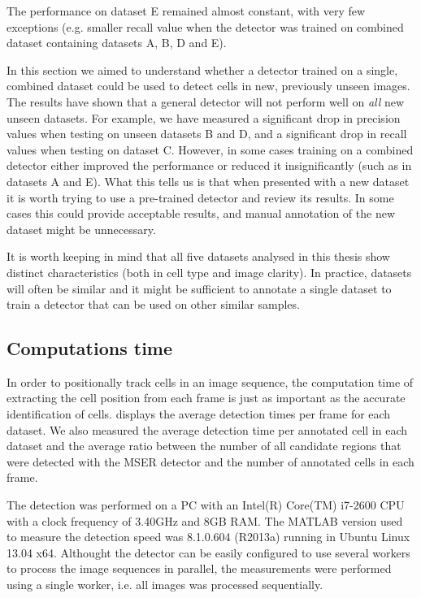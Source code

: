 		The performance on dataset E remained almost constant, with very few exceptions (e.g. smaller recall value when the detector was trained on combined dataset containing datasets A, B, D and E).

		In this section we aimed to understand whether a detector trained on a single, combined dataset could be used to detect cells in new, previously unseen images. The results have shown that a general detector will not perform well on \textit{all} new unseen datasets. For example, we have measured a significant drop in precision values when testing on unseen datasets B and D, and a significant drop in recall values when testing on dataset C. However, in some cases training on a combined detector either improved the performance or reduced it insignificantly (such as in datasets A and E). What this tells us is that when presented with a new dataset it is worth trying to use a pre-trained detector and review its results. In some cases this could provide acceptable results, and manual annotation of the new dataset might be unnecessary.
		
		It is worth keeping in mind that all five datasets analysed in this thesis show distinct characteristics (both in cell type and image clarity). In practice, datasets will often be similar and it might be sufficient to annotate a single dataset to train a detector that can be used on other similar samples.
	
	\subsection{Computations time}
	
		In order to positionally track cells in an image sequence, the computation time of extracting the cell position from each frame is just as important as the accurate identification of cells.  displays the average detection times per frame for each dataset. We also measured the average detection time per annotated cell in each dataset and the average ratio between the number of all candidate regions that were detected with the MSER detector and the number of annotated cells in each frame.
		
		The detection was performed on a PC with an Intel(R) Core(TM) i7-2600 CPU with a clock frequency of 3.40GHz and 8GB RAM. The MATLAB version used to measure the detection speed was 8.1.0.604 (R2013a) running in Ubuntu Linux 13.04 x64. Althought the detector can be easily configured to use several workers to process the image sequences in parallel, the measurements were performed using a single worker, i.e. all images was processed sequentially.
		
